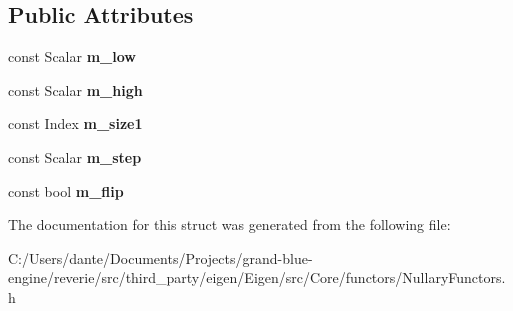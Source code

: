 \subsection*{Public Attributes}
\begin{DoxyCompactItemize}
\item 
\mbox{\label{struct_eigen_1_1internal_1_1linspaced__op__impl_3_01_scalar_00_01_packet_00_01false_01_4_aafac3e238fdf7f360ab3dbb918b4677a}} 
const Scalar {\bfseries m\+\_\+low}
\item 
\mbox{\label{struct_eigen_1_1internal_1_1linspaced__op__impl_3_01_scalar_00_01_packet_00_01false_01_4_a560f63a7288371a1a3ebb5665e75aed4}} 
const Scalar {\bfseries m\+\_\+high}
\item 
\mbox{\label{struct_eigen_1_1internal_1_1linspaced__op__impl_3_01_scalar_00_01_packet_00_01false_01_4_afa389e12b17a1438151e05844012a284}} 
const Index {\bfseries m\+\_\+size1}
\item 
\mbox{\label{struct_eigen_1_1internal_1_1linspaced__op__impl_3_01_scalar_00_01_packet_00_01false_01_4_abfc4922bd0305b65294c456f52e5c822}} 
const Scalar {\bfseries m\+\_\+step}
\item 
\mbox{\label{struct_eigen_1_1internal_1_1linspaced__op__impl_3_01_scalar_00_01_packet_00_01false_01_4_a422d20eed81476744f4f8ecb28a599ff}} 
const bool {\bfseries m\+\_\+flip}
\end{DoxyCompactItemize}


The documentation for this struct was generated from the following file\+:\begin{DoxyCompactItemize}
\item 
C\+:/\+Users/dante/\+Documents/\+Projects/grand-\/blue-\/engine/reverie/src/third\+\_\+party/eigen/\+Eigen/src/\+Core/functors/Nullary\+Functors.\+h\end{DoxyCompactItemize}
